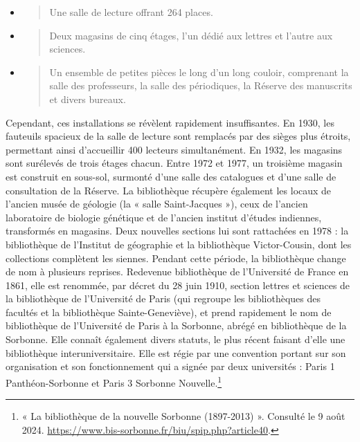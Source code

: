 \documentclass[a4paper,12pt,twoside]{book}
\begin{document}
\begin{itemize}
	\item
	\begin{quote}
		Une salle de lecture offrant 264 places.
	\end{quote}
	\item
	\begin{quote}
		Deux magasins de cinq étages, l'un dédié aux lettres
		et l'autre aux sciences.
	\end{quote}
	\item
	\begin{quote}
		Un ensemble de petites pièces le long d'un long
		couloir, comprenant la salle des professeurs, la salle des
		périodiques, la Réserve des manuscrits et divers bureaux. \\
	\end{quote}
\end{itemize}

Cependant, ces installations se révèlent rapidement insuffisantes. En
1930, les fauteuils spacieux de la salle de lecture sont remplacés par
des sièges plus étroits, permettant ainsi d'accueillir
400 lecteurs simultanément. En 1932, les magasins sont surélevés de
trois étages chacun. Entre 1972 et 1977, un troisième magasin est
construit en sous-sol, surmonté d'une salle des
catalogues et d'une salle de consultation de la Réserve.
La bibliothèque récupère également les locaux de
l'ancien musée de géologie (la « salle Saint-Jacques »),
ceux de l'ancien laboratoire de biologie génétique et de
l'ancien institut d'études indiennes,
transformés en magasins. Deux nouvelles sections lui sont rattachées en
1978 : la bibliothèque de l'Institut de géographie et la
bibliothèque Victor-Cousin, dont les collections complètent les siennes.
Pendant cette période, la bibliothèque change de nom à plusieurs
reprises. Redevenue bibliothèque de l'Université de
France en 1861, elle est renommée, par décret du 28 juin 1910, section
lettres et sciences de la bibliothèque de l'Université
de Paris (qui regroupe les bibliothèques des facultés et la bibliothèque
Sainte-Geneviève), et prend rapidement le nom de bibliothèque de
l'Université de Paris à la Sorbonne, abrégé en
bibliothèque de la Sorbonne. Elle connaît également divers statuts, le
plus récent faisant d'elle une bibliothèque
interuniversitaire. Elle est régie par une convention portant sur son
organisation et son fonctionnement qui a signée par deux universités :
Paris 1 Panthéon-Sorbonne et Paris 3 Sorbonne Nouvelle.\footnote{« La
	bibliothèque de la nouvelle Sorbonne (1897-2013) ». Consulté le 9 août
	2024.
	\url{https://www.bis-sorbonne.fr/biu/spip.php?article40}.} \\
\end{document}
